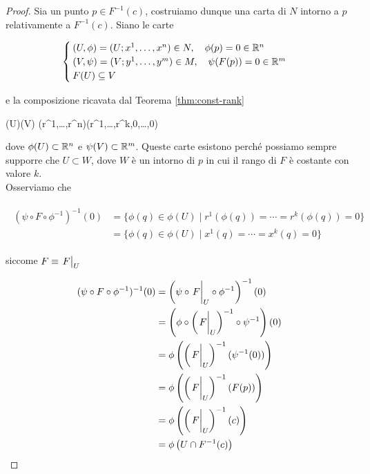 \begin{proof}
	Sia un punto $ p \in F^{-1}(c) $, costruiamo dunque una carta di $ N $ intorno a $ p $ relativamente a $ F^{-1}(c) $. Siano le carte

	\begin{equation}
		\begin{cases}
			(U,\phi) = (U; x^{1},\dots,x^{n}) \in N \qcomma \phi(p) = 0 \in \R^{n} \\
			(V,\psi) = (V; y^{1},\dots,y^{m}) \in M \qcomma \psi(F(p)) = 0  \in \R^{m} \\
			F(U) \subseteq V
		\end{cases}
	\end{equation}

	e la composizione ricavata dal Teorema \ref{thm:const-rank}
	
		{\phi(U)}{\psi(V)}
		{(r^{1},\dots,r^{n})}{(r^{1},\dots,r^{k},0,\dots,0)}

	dove $ \phi(U) \subset \mathbb{R}^{n} $ e $ \psi(V) \subset \mathbb{R}^{m} $. Queste carte esistono perché possiamo sempre supporre che $ U \subset W $, dove $ W $ è un intorno di $ p $ in cui il rango di $ F $ è costante con valore $ k $.\\
	Osserviamo che
	
	\begin{align}
		\begin{split}
			(\psi \circ F \circ \phi^{-1})^{-1}(0) &= \{ \phi(q) \in \phi(U) \mid r^{1}(\phi(q)) = \cdots = r^{k}(\phi(q)) = 0 \}\\
			&= \{ \phi(q) \in \phi(U) \mid x^{1}(q) = \cdots = x^{k}(q) = 0 \}
		\end{split}
	\end{align}

	siccome $ F \equiv \eval{F}_{U} $
	
	\begin{align}
		\begin{split}
			(\psi \circ F \circ \phi^{-1})^{-1}(0) &= \left( \psi \circ \eval{F}_{U} \circ \phi^{-1} \right)^{-1}(0) \\
			&= \left( \phi \circ \left( \eval{F}_{U} \right)^{-1} \circ \psi^{-1} \right)(0) \\
			&= \phi \left( \left( \eval{F}_{U} \right)^{-1}(\psi^{-1}(0)) \right) \\
			&= \phi \left( \left( \eval{F}_{U} \right)^{-1}(F(p)) \right) \\
			&= \phi \left( \left( \eval{F}_{U} \right)^{-1}(c) \right) \\
			&= \phi \left( U \cap F^{-1}(c) \right)
		\end{split}
	\end{align}


\end{proof}
